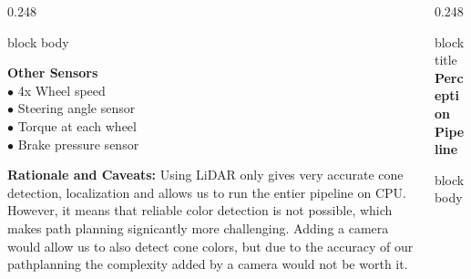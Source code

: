 \documentclass[final]{beamer}
\begin{document}
\begin{frame}[t,fragile]{}
\begin{columns}[t,totalwidth=\textwidth]
\begin{column}{0.248\textwidth}
\begin{beamercolorbox}[rounded=true,sep=0.38cm,wd=\linewidth]{block body}
  \begin{tcolorbox}[pbox]
    {\color{primary}\bfseries Other Sensors}\\[3pt]
    \small
    $\bullet$ 4x Wheel speed\\
    $\bullet$ Steering angle sensor\\
    $\bullet$ Torque at each wheel\\
    $\bullet$ Brake pressure sensor
  \end{tcolorbox}
  \begin{tcolorbox}[ybox]
    \small\color{darkprimary}
    \textbf{Rationale and Caveats:} Using LiDAR only gives very accurate cone detection, localization and
    allows us to run the entier pipeline on CPU. However, it means that reliable color detection is not possible,
    which makes path planning signicantly more challenging. Adding a camera would allow us to also detect cone colors,
    but due to the accuracy of our pathplanning the complexity added by a camera would not be worth it.
  \end{tcolorbox}
  \end{beamercolorbox}
\end{column}
\begin{column}{0.248\textwidth}
\begin{beamercolorbox}[rounded=true,sep=0.30cm,wd=\linewidth]{block title}
  \large\bfseries Perception Pipeline
\end{beamercolorbox}
\begin{beamercolorbox}[rounded=true,sep=0.38cm,wd=\linewidth]{block body}
  \centering


\end{beamercolorbox}
\end{column}
\end{columns}
\end{frame}
\end{document}
